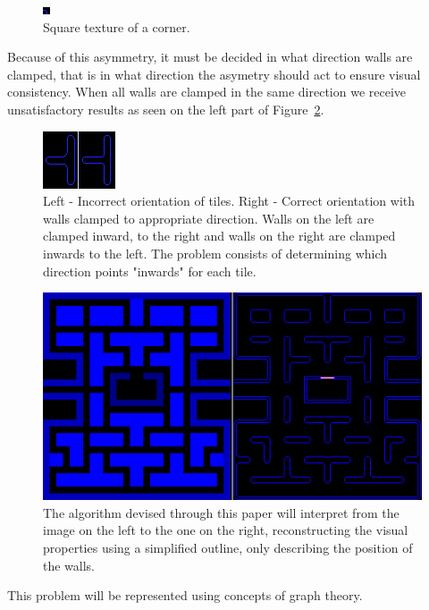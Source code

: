 \begin{figure}[H]
\centering
\includegraphics[width=0.4\linewidth]{Image-3.png}
\caption {Square texture of a corner.\autocite{myself}}\label{CornerTexture}
\end{figure}

Because of this asymmetry, it must be decided in what direction walls are clamped, that is in what direction the asymetry should act to ensure visual consistency. When all walls are clamped in the same direction we receive unsatisfactory results as seen on the left part of Figure~\ref{WallTextureAsymmetry}. 

\begin{figure}[H]
\centering
\includegraphics[width=0.4\linewidth]{Image-4.png}
\caption {Left - Incorrect orientation of tiles. Right - Correct orientation with walls clamped to appropriate direction. Walls on the left are clamped inward, to the right and walls on the right are clamped inwards to the left. The problem consists of determining which direction points "inwards" for each tile.\autocite{myself}}\label{WallTextureAsymmetry}
\end{figure}

\begin{figure}[H]
\centering
\includegraphics[width=0.8\linewidth]{Image-5.png}
\caption {The algorithm devised through this paper will interpret from the image on the left to the one on the right, reconstructing the visual properties using a simplified outline, only describing the position of the walls.\autocite{myself}}\label{LevelWallConversion}
\end{figure}

This problem will be represented using concepts of graph theory.